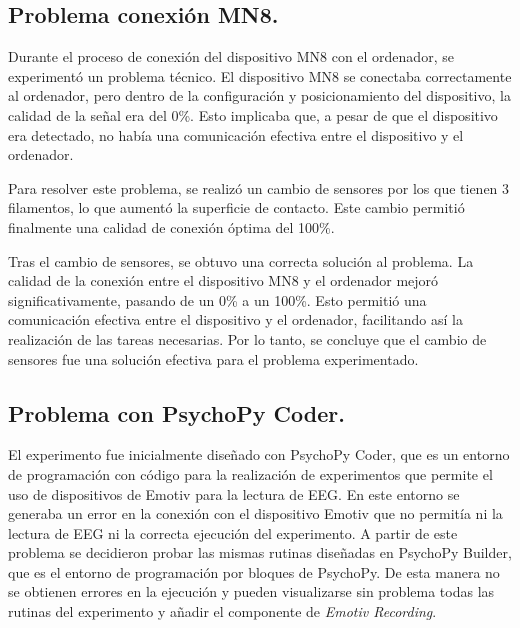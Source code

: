 \subsection{Problema conexión MN8.}
Durante el proceso de conexión del dispositivo MN8 con el ordenador, se experimentó un problema técnico. El dispositivo MN8 se conectaba correctamente al ordenador, pero dentro de la configuración y posicionamiento del dispositivo, la calidad de la señal era del 0\%. Esto implicaba que, a pesar de que el dispositivo era detectado, no había una comunicación efectiva entre el dispositivo y el ordenador.

Para resolver este problema, se realizó un cambio de sensores por los que tienen 3 filamentos, lo que aumentó la superficie de contacto. Este cambio permitió finalmente una calidad de conexión óptima del 100\%.

Tras el cambio de sensores, se obtuvo una correcta solución al problema. La calidad de la conexión entre el dispositivo MN8 y el ordenador mejoró significativamente, pasando de un 0\% a un 100\%. Esto permitió una comunicación efectiva entre el dispositivo y el ordenador, facilitando así la realización de las tareas necesarias. Por lo tanto, se concluye que el cambio de sensores fue una solución efectiva para el problema experimentado.

\subsection{Problema con PsychoPy Coder.}
El experimento fue inicialmente diseñado con PsychoPy Coder, que es un entorno de programación con código para la realización de experimentos que permite el uso de dispositivos de Emotiv para la lectura de EEG. En este entorno se generaba un error en la conexión con el dispositivo Emotiv que no permitía ni la lectura de EEG ni la correcta ejecución del experimento. A partir de este problema se decidieron probar las mismas rutinas diseñadas en PsychoPy Builder, que es el entorno de programación por bloques de PsychoPy. De esta manera no se obtienen errores en la ejecución y pueden visualizarse sin problema todas las rutinas del experimento y añadir el componente de\textit{ Emotiv Recording}.
